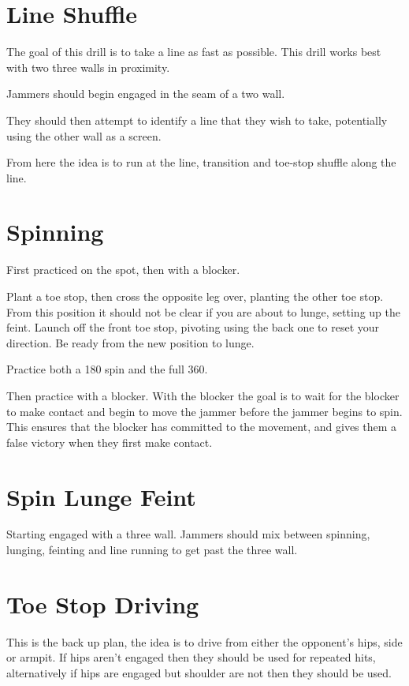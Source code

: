 \documentclass{journal}
\begin{document}
\section*{Line Shuffle}
\label{drill:static_block:line_shuffle}

The goal of this drill is to take a line as fast as possible.
This drill works best with two three walls in proximity.

Jammers should begin engaged in the seam of a two wall.

They should then attempt to identify a line that they wish to take, potentially using the other wall as a screen.

From here the idea is to run at the line, transition and toe-stop shuffle along the line. 


\section*{Spinning}
\label{drill:static_block:spin_to_win}
First practiced on the spot, then with a blocker. 

Plant a toe stop, then cross the opposite leg over, planting the other toe stop.
From this position it should not be clear if you are about to lunge, setting up the feint. 
Launch off the front toe stop, pivoting using the back one to reset your direction. 
Be ready from the new position to lunge.

Practice both a 180 spin and the full 360.

Then practice with a blocker.
With the blocker the goal is to wait for the blocker to make contact and begin to move the jammer before the jammer begins to spin.  
This ensures that the blocker has committed to the movement, and gives them a false victory when they first make contact. 

\section*{Spin Lunge Feint}
\label{drill:static_block:spin_lunge_feint}
Starting engaged with a three wall. 
Jammers should mix between spinning, lunging, feinting and line running to get past the three wall. 


\section*{Toe Stop Driving}
\label{drill:active_blocking:drive}
This is the back up plan, the idea is to drive from either the opponent's hips, side or armpit. 
If hips aren't engaged then they should be used for repeated hits, alternatively if hips are engaged but shoulder are not then they should be used.
\end{document}
